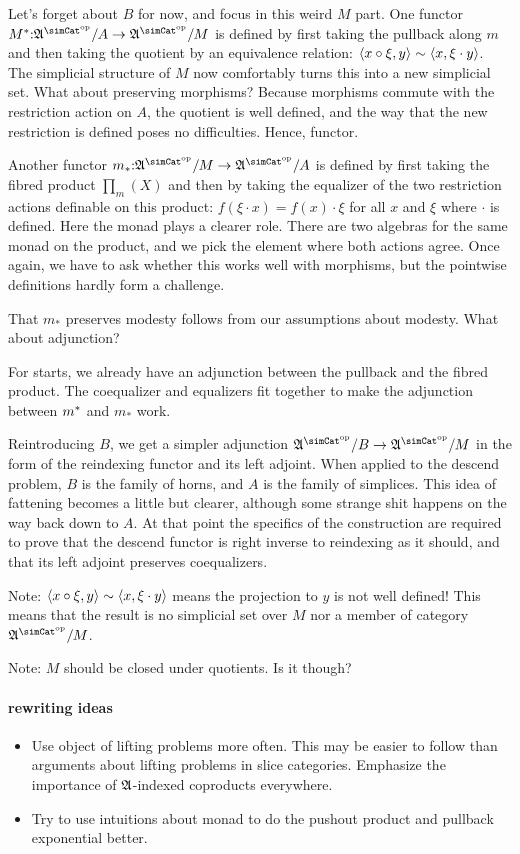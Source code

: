 \documentclass[csh.tex]{subfiles}
\begin{document}
Let's forget about $B$ for now, and focus in this weird $M$ part. One functor $M\ri\of \ambient\s/A\to\ambient\s/M$ is defined by first taking the pullback along $m$ and then taking the quotient by an equivalence relation: $\left\langle x\circ \xi , y \right\rangle\sim\left\langle x,\xi\cdot y \right\rangle$. The simplicial structure of $M$ now comfortably turns this into a new simplicial set. What about preserving morphisms? Because morphisms commute with the restriction action on $A$, the quotient is well defined, and the way that the new restriction is defined poses no difficulties. Hence, functor.

Another functor $m_*\of\ambient\s/M\to \ambient\s/A$ is defined by first taking the fibred product $\prod_m(X)$ and then by taking the equalizer of the two restriction actions definable on this product: $f(\xi\cdot x) = f(x)\cdot \xi$ for all $x$ and $\xi$ where $\cdot$ is defined. Here the monad plays a clearer role. There are two algebras for the same monad on the product, and we pick the element where both actions agree.
Once again, we have to ask whether this works well with morphisms, but the pointwise definitions hardly form a challenge.

That $m_*$ preserves modesty follows from our assumptions about modesty. What about adjunction?

For starts, we already have an adjunction between the pullback and the fibred product. The coequalizer and equalizers fit together to make the adjunction between $m^*$ and $m_*$ work.

Reintroducing $B$, we get a simpler adjunction $\ambient\s/B\to \ambient\s/M$ in the form of the reindexing functor and its left adjoint. When applied to the descend problem, $B$ is the family of horns, and $A$ is the family of simplices. This idea of fattening becomes a little but clearer, although some strange shit happens on the way back down to $A$. At that point the specifics of the construction are required to prove that the descend functor is right inverse to reindexing as it should, and that its left adjoint preserves coequalizers.

Note: $\left\langle x\circ \xi , y \right\rangle\sim\left\langle x,\xi\cdot y \right\rangle$ means the projection to $y$ is not well defined! This means that the result is no simplicial set over $M$ nor a member of category $\ambient\s/M$.

Note: $M$ should be closed under quotients. Is it though?


\paragraph{rewriting ideas}
\begin{itemize}
\item Use object of lifting problems more often. This may be easier to follow than arguments about lifting problems in slice categories. Emphasize the importance of $\mathfrak A$-indexed coproducts everywhere.
\item Try to use intuitions about monad to do the pushout product and pullback exponential better.
\end{itemize}
\end{document}
